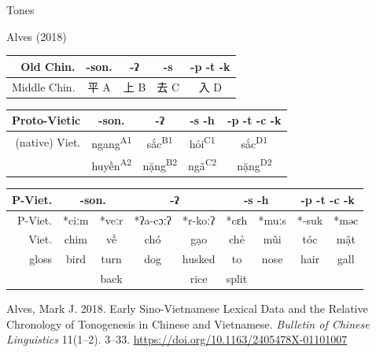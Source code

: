 \documentclass{beamer}
\begin{document}
\begin{frame}[fragile]{Tones}

Alves (2018)\\
\medskip
\begin{tabular}{r|c c c c}
    Old Chin. & -son. & -ʔ & -s & -p -t -k\\ \hline
    Middle Chin. & 平 A & 上 B & 去 C & 入 D\\
\end{tabular}

\bigskip
\begin{tabular}{r|c c c c}
    Proto-Vietic & -son. & -ʔ & -s -h & -p -t -c -k\\ \hline
    (native) Viet. & ngang\textsuperscript{A1} & sắc\textsuperscript{B1} & hỏi\textsuperscript{C1} & sắc\textsuperscript{D1}\\
     & huyền\textsuperscript{A2} & nặng\textsuperscript{B2} & ngã\textsuperscript{C2} & nặng\textsuperscript{D2}\\ 
\end{tabular}

\bigskip
{\footnotesize
\begin{tabular}{r|c c|c c|c c|c c}
    P-Viet. & \multicolumn{2}{c|}{-son.} & \multicolumn{2}{c|}{-ʔ} & \multicolumn{2}{c|}{-s -h} & \multicolumn{2}{c}{-p -t -c -k}\\ \hline
    P-Viet. & *ciːm & *veːr & *ʔa-cɔːʔ & *r-koːʔ & *cɛh & *muːs & *-suk & *məc\\ 
    Viet. & chim & về & chó & gạo & chẻ & mũi & tóc & mật\\ \hline
    gloss & bird & turn & dog & husked & to & nose & hair & gall\\
     & & back & & rice & split & & & \\
\end{tabular}
}

\vfill {} {\tiny Alves, Mark J. 2018. Early Sino-Vietnamese Lexical Data and the Relative Chronology of Tonogenesis in Chinese and Vietnamese. \textit{Bulletin of Chinese Linguistics} 11(1–2). 3–33. \url{https://doi.org/10.1163/2405478X-01101007}}\par

\end{frame}
\end{document}

